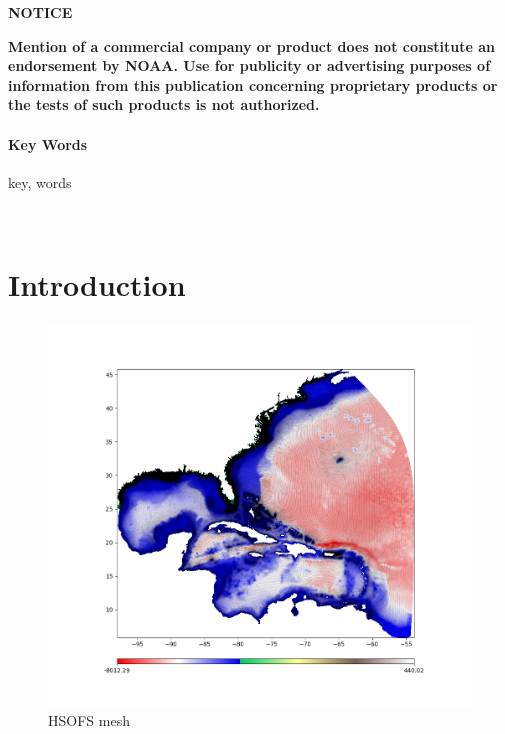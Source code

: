 \documentclass[12pt,english]{article}
\begin{document}
\newpage{}

\vspace*{\fill}

\begin{center}
\textbf{\large{NOTICE}}
\end{center}

\vspace*{\bigskipamount}

\noindent \textbf{Mention of a commercial company or product does not constitute an endorsement by NOAA. Use for publicity or advertising purposes of information from this publication concerning proprietary products or the tests of such products is not authorized.}

\vspace*{\fill}

\newpage{}

\tableofcontents{}

\listoffigures

\newpage{}

\begin{abstract}
\lipsum[1] \cite{Taguchi2014}
\end{abstract}

\paragraph{Key Words}

key, words

\newpage ~\newpage{}

\setcounter{page}{1}

\section{Introduction}

\lipsum[1] \cite{Egbert2002}

\lipsum[1-3]

\begin{figure}
    \includegraphics[width=\textwidth, keepaspectratio]{images/hsofs_mesh.png}
    \caption{HSOFS mesh}
    \label{fig:hsofs_mesh}
\end{figure}
\end{document}
